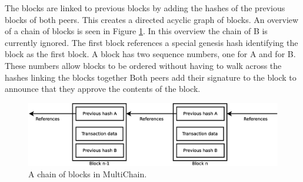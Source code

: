 The blocks are linked to previous blocks by adding the hashes of the previous blocks of both peers.
This creates a directed acyclic graph of blocks.
An overview of a chain of blocks is seen in Figure \ref{fig:transaction-chain}.
In this overview the chain of B is currently ignored.
The first block references a special genesis hash identifying the block as the first block.
A block has two sequence numbers, one for A and for B.
These numbers allow blocks to be ordered without having to walk across the hashes linking the blocks together
Both peers add their signature to the block to announce that they approve the contents of the block.

\begin{figure}
	\centerline{\includegraphics[scale=0.3]{design/figs/transaction-chain.eps}}
	\caption{A chain of blocks in MultiChain.}
	\label{fig:transaction-chain}
\end{figure}
